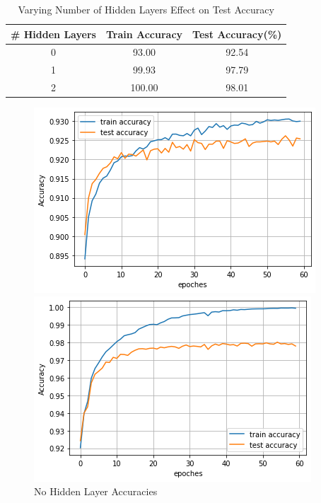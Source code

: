 \documentclass[11pt]{homework}
\begin{document}
\begin{table}[h!] 
\centering
\begin{tabular}{||c c c||} 
\hline
 # Hidden Layers & Train Accuracy & Test Accuracy(\%) \\ [0.5ex]
 \hline\hline
 0  & 93.00  & 92.54   \\ 
 1  & 99.93  & 97.79   \\ 
 2  & 100.00 & 98.01   \\ 
 \hline
\end{tabular}
\caption{Varying Number of Hidden Layers Effect on Test Accuracy}
\label{table-varying-hidden-layers}
\end{table}

\begin{figure}[h!]
  \centering
  \begin{minipage}[h]{0.3\textwidth}
    \includegraphics[width=\textwidth]{acc-0.png}
    \caption{No Hidden Layer Accuracies}
    \label{acc-0}
  \end{minipage}
\hfill
   \begin{minipage}[h]{0.3\textwidth}
    \includegraphics[width=\textwidth]{acc-1-128-relu.png}

\end{minipage}
\end{figure}
\end{document}

